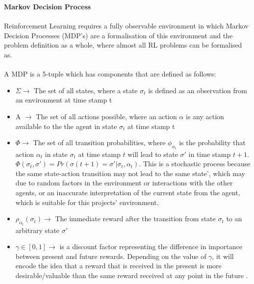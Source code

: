 \documentclass[ %
                    author={Ashwinder Khurana},
                supervisor={Prof Dave Cliff},
                    degree={MEng},
                     title={The Deeply Reinforced Trader},
                  subtitle={},
                      type={enterprise},
                      year={2020} ]{dissertation}
\begin{document}
\noindent
\textbf{Markov Decision Process}
\\
\\
Reinforcement Learning requires a fully observable environment in which Markov Decision Processes (MDP's) are a formalisation of this environment and the problem definition as a whole, where almost all RL problems can be formalised as. 
\\
\\
\noindent 
A MDP is a 5-tuple which has components that are defined as follows:
\begin{itemize}
\item $\Sigma \rightarrow$ The set of all states, where a state $\sigma_t$ is defined as an observation from an 
environment at time stamp t
\item  A $\rightarrow$ The set of all actions possible, where an action $\alpha$ is any action available to the the agent in state $\sigma_t$ at time stamp t
\item $\Phi \rightarrow$ The set of all transition probabilities, where $\phi_{\alpha_t}$ is the probability that action $\alpha_t$ in state $\sigma_t$ at time stamp $t$ will lead to state $\sigma'$ in time stamp $t+1$. 
$\Phi(\sigma_t, \sigma') = Pr(\sigma(t+1) = \sigma' | \sigma_t, \alpha_t)$. This is a stochastic process because the same state-action transition may not lead to the same state', which may due to random factors in the environment or interactions with the other agents, or an inaccurate interpretation of the current state from the agent, which is suitable for this projects' environment. 
\item $\rho_{\alpha_t}(\sigma_t) \rightarrow$ The immediate reward after the transition from state $\sigma_t$ to an arbitrary state $\sigma'$ 
\item $\gamma \in [0,1]\rightarrow$ is a discount factor representing the difference in importance between present and future rewards. Depending on the value of $\gamma$, it will encode the idea that a reward that is received in the present is more desirable/valuable than the same reward received at any point in the future . 



\end{itemize}
\vspace{0.5cm}
\noindent
\end{document}
